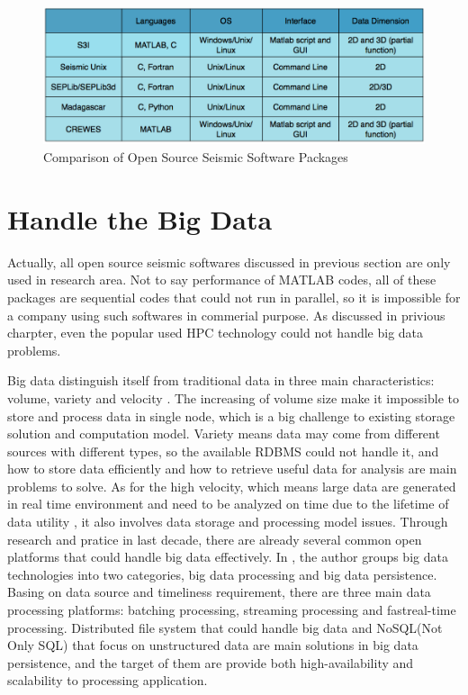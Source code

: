 \begin{figure}[h]
\centering
\includegraphics[scale=.42]{figures/open_package_list.png}
\caption{Comparison of Open Source Seismic Software Packages \cite{CeGPS3I}}
\label{open_package_list}
\end{figure}

\section{Handle the Big Data}
Actually, all open source seismic softwares discussed in previous section are only used in research area. Not to say performance of MATLAB codes, all of these packages are sequential codes that could not run in parallel, so it is impossible for a company using such softwares in commerial purpose. As discussed in privious charpter, even the popular used HPC technology could not handle big data problems. 

Big data distinguish itself from traditional data in three main characteristics: volume, variety and velocity \cite{CharactOfBigData}. The increasing of volume size make it impossible to store and process data in single node, which is a big challenge to existing storage solution and computation model. Variety means data may come from different sources with different types, so the available RDBMS could not handle it, and how to store data efficiently and how to retrieve useful data for analysis are main problems to solve. As for the high velocity, which means large data are generated in real time environment and need to be analyzed on time due to the lifetime of data utility \cite{CharactOfBigData}, it also involves data storage and processing model issues. Through research and pratice in last decade, there are already several common open platforms that could handle big data effectively. In \cite{ChallengeOfBigData}, the author groups big data technologies into two categories, big data processing and big data persistence. Basing on data source and timeliness requirement, there are three main data processing platforms: batching processing, streaming processing and fast\/real-time processing. Distributed file system that could handle big data and NoSQL(Not Only SQL) that focus on unstructured data are main solutions in big data persistence, and the target of them are provide both high-availability and scalability to processing application.  

